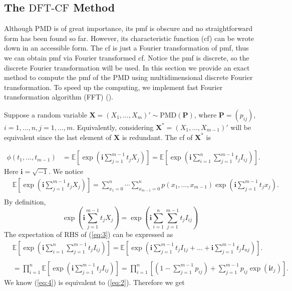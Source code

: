 \documentclass[12pt]{article}
\newcommand{\EE}{\mathbb{E}}
\newcommand{\Pmat}{\mathbf{P}}
\newcommand{\ivec}{{\boldsymbol{i}}}
\newcommand{\PMD}{\textrm{PMD}}
\newcommand{\Xvec}{\boldsymbol{X}}
\newcommand{\dft}{{\textrm{DFT-CF}}}
\begin{document}
\subsection{The $\dft$ Method}
Although $\PMD$ is of great importance, its pmf is obscure and no straightforward form has been found so far. However, its characteristic function (cf) can be wrote down in an accessible form. The cf is just a Fourier transformation of pmf, thus we can obtain pmf via Fourier transformed cf. Notice the pmf is discrete, so the discrete Fourier transformation will be used. In this section we provide an exact method to compute the pmf of the PMD using multidimensional discrete Fourier transformation. To speed up the computing, we implement fast Fourier transformation algorithm (FFT) ().

Suppose a random variable $\Xvec =  (X_1, \dots, X_{m})' \sim \PMD(\Pmat)$, where $\Pmat = (p_{ij})$, $i=1,\dots,n,j=1,\dots,m$. Equivalently, considering $\Xvec^{\ast} = (X_1, \dots, X_{m-1})'$ will be equivalent since the last element of $\Xvec$ is redundant. The cf of $\Xvec^{\ast}$ is

\begin{align}
\phi(t_1, \dots, t_{m-1}) & = \EE\left[\exp\left(\ivec\sum_{j=1}^{m-1}t_jX_j\right)\right]=\EE\left[\exp\left(\ivec\sum_{i = 1}^n \sum_{j=1}^{m-1}t_j I_{ij}\right)\right].
\end{align}
Here $\ivec=\sqrt{-1}$. We notice
\begin{equation}\label{eq:2}
\begin{split}
  &\EE\left[\exp\left(\ivec\sum_{j=1}^{m-1}t_jX_j\right)\right] = \sum_{x_1 = 0}^{n}\cdots \sum_{x_{m-1} = 0}^n p(x_1,\ldots,x_{m-1})\exp\left(\ivec\sum_{j=1}^{m-1}t_jx_j\right).\\
\end{split}
\end{equation}
By definition,
\begin{equation}\label{eq:3}
\exp\left(\ivec\sum_{j=1}^{m-1}t_jX_j\right)= \exp\left(\ivec\sum_{i = 1}^n \sum_{j=1}^{m-1}t_j I_{ij}\right)
\end{equation}
The expectation of RHS of (\ref{eq:3}) can be expressed as
\begin{equation}\label{eq:4}
\begin{split}
  &\EE\left[\exp\left(\ivec\sum_{i = 1}^n \sum_{j=1}^{m-1}t_j I_{ij}\right)\right] = \EE\left[ \exp\left( \ivec\sum_{j=1}^{m-1} t_jI_{1j} + \dots + \ivec\sum_{j=1}^{m-1} t_jI_{nj}\right)\right].\\
  \\
  & = \prod_{i=1}^n \EE\left[ \exp\left( \ivec \sum_{j=1}^{m-1} t_j I_{ij}\right)\right] = \prod_{i=1}^n \left[(1 - \sum_{j=1}^{m-1}p_{ij})+\sum_{j=1}^{m-1}p_{ij}\exp(\ivec t_j)\right].
\end{split}
\end{equation}
We know (\ref{eq:4}) is equivalent to (\ref{eq:2}). Therefore we get
\end{document}
